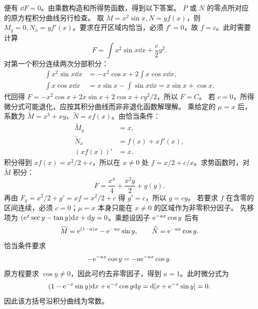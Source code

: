 便有 $\dd F=0$。由乘数构造和所得势函数，得到以下答案。
$P$ 或 $N$ 的零点所对应的原方程积分曲线另行检查。
取 $M=x^2\sin x,N=yf(x)$，则 $M_y=0,N_x=yf'(x)$。要求在开区域内恰当，必须 $f'=0$，故 $f=c$。此时需要计算
\[
F=\int x^2\sin x\dd x+\dfrac c2y^2.
\]
对第一个积分连续两次分部积分：
\[
\begin{aligned}
\int x^2\sin x\dd x&=-x^2\cos x+2\int x\cos x\dd x,\\
\int x\cos x\dd x&=x\sin x-\int\sin x\dd x
=x\sin x+\cos x.
\end{aligned}
\]
代回得 $F=-x^2\cos x+2x\sin x+2\cos x+cy^2/2$，所以 $F=C$。
若 $c=0$，所得微分式可能退化，应按其积分曲线而非非退化函数解理解。
乘给定的 $\mu=x$ 后，系数为 $\widetilde M=x^3+xy$、$\widetilde N=xf(x)$。由恰当条件：
\[
\begin{aligned}
\widetilde M_y&=x,\\
\widetilde N_x&=f(x)+xf'(x),\\
(xf(x))'&=x.
\end{aligned}
\]
积分得到 $xf(x)=x^2/2+c$，所以在 $x\ne0$ 处 $f=x/2+c/x$。求势函数时，对 $\widetilde M$ 积分：
\[
F=\dfrac{x^4}{4}+\dfrac{x^2y}{2}+g(y).
\]
再由 $F_y=x^2/2+g'=xf=x^2/2+c$ 得 $g'=c$，所以 $g=cy$。
若要求 $f$ 在含零的区间连续，必须 $c=0$；$\mu=x$ 本身只能在 $x\ne0$ 的区域作为非零积分因子。
先移项为 $(\mathrm e^x\sec y-\tan y)\mathrm d x+\mathrm d y=0$。乘题设因子 $\mathrm e^{-ax}\cos y$ 后有
\[
\widetilde M=\mathrm e^{(1-a)x}-\mathrm e^{-ax}\sin y,\qquad
\widetilde N=\mathrm e^{-ax}\cos y.
\]
恰当条件要求
\[
-\mathrm e^{-ax}\cos y=-a\mathrm e^{-ax}\cos y.
\]
原方程要求 $\cos y\ne0$，因此可约去非零因子，得到 $a=1$。此时微分式为
\[
(1-\mathrm e^{-x}\sin y)\mathrm d x+\mathrm e^{-x}\cos y\mathrm d y
=\mathrm d[x+\mathrm e^{-x}\sin y]=0.
\]
因此该方括号沿积分曲线为常数。
